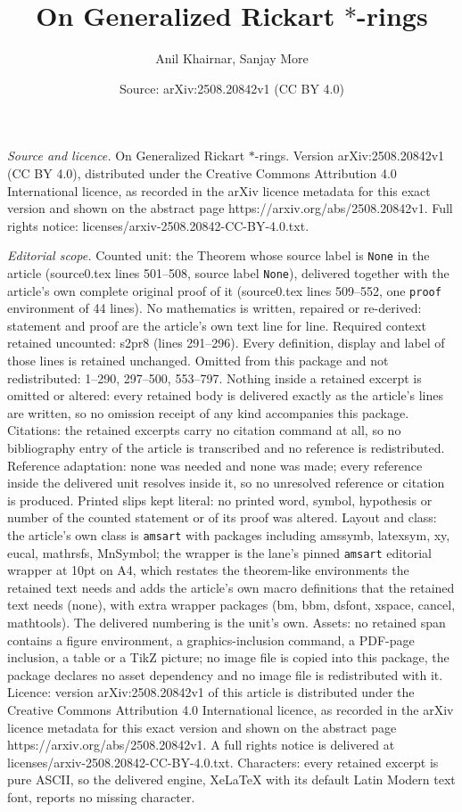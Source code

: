 \documentclass[10pt,a4paper]{amsart}
\title[On Generalized Rickart $*$-rings]{On Generalized Rickart $*$-rings}
\author{Anil Khairnar, Sanjay More}
\date{Source: arXiv:2508.20842v1 (CC BY 4.0)}
\begin{document}
\maketitle

\noindent\emph{Source and licence.} On Generalized Rickart $*$-rings. Version arXiv:2508.20842v1 (CC BY 4.0), distributed under the Creative Commons Attribution 4.0 International licence, as recorded in the arXiv licence metadata for this exact version and shown on the abstract page https://arxiv.org/abs/2508.20842v1. Full rights notice: licenses/arxiv-2508.20842-CC-BY-4.0.txt.\par\smallskip

\noindent\textit{Editorial scope.} Counted unit: the Theorem whose source label is \texttt{None} in the article (source0.tex lines 501--508, source label \texttt{None}), delivered together with the article's own complete original proof of it (source0.tex lines 509--552, one \texttt{proof} environment of 44 lines). No mathematics is written, repaired or re-derived: statement and proof are the article's own text line for line. Required context retained uncounted: s2pr8 (lines 291--296). Every definition, display and label of those lines is retained unchanged. Omitted from this package and not redistributed: 1--290, 297--500, 553--797. Nothing inside a retained excerpt is omitted or altered: every retained body is delivered exactly as the article's lines are written, so no omission receipt of any kind accompanies this package. Citations: the retained excerpts carry no citation command at all, so no bibliography entry of the article is transcribed and no reference is redistributed. Reference adaptation: none was needed and none was made; every reference inside the delivered unit resolves inside it, so no unresolved reference or citation is produced. Printed slips kept literal: no printed word, symbol, hypothesis or number of the counted statement or of its proof was altered. Layout and class: the article's own class is \texttt{amsart} with packages including amssymb, latexsym, xy, eucal, mathrsfs, MnSymbol; the wrapper is the lane's pinned \texttt{amsart} editorial wrapper at 10pt on A4, which restates the theorem-like environments the retained text needs and adds the article's own macro definitions that the retained text needs (none), with extra wrapper packages (bm, bbm, dsfont, xspace, cancel, mathtools). The delivered numbering is the unit's own. Assets: no retained span contains a figure environment, a graphics-inclusion command, a PDF-page inclusion, a table or a TikZ picture; no image file is copied into this package, the package declares no asset dependency and no image file is redistributed with it. Licence: version arXiv:2508.20842v1 of this article is distributed under the Creative Commons Attribution 4.0 International licence, as recorded in the arXiv licence metadata for this exact version and shown on the abstract page https://arxiv.org/abs/2508.20842v1. A full rights notice is delivered at licenses/arxiv-2508.20842-CC-BY-4.0.txt. Characters: every retained excerpt is pure ASCII, so the delivered engine, XeLaTeX with its default Latin Modern text font, reports no missing character.
\end{document}
